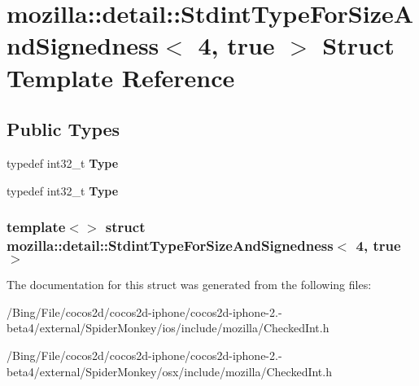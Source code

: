 \hypertarget{structmozilla_1_1detail_1_1_stdint_type_for_size_and_signedness_3_014_00_01true_01_4}{\section{mozilla\-:\-:detail\-:\-:Stdint\-Type\-For\-Size\-And\-Signedness$<$ 4, true $>$ Struct Template Reference}
\label{structmozilla_1_1detail_1_1_stdint_type_for_size_and_signedness_3_014_00_01true_01_4}
}
\subsection*{Public Types}
\begin{DoxyCompactItemize}
\item 
\hypertarget{structmozilla_1_1detail_1_1_stdint_type_for_size_and_signedness_3_014_00_01true_01_4_a237ad7b5316d92211b73f9ccb6250cec}{typedef int32\-\_\-t {\bfseries Type}}\label{structmozilla_1_1detail_1_1_stdint_type_for_size_and_signedness_3_014_00_01true_01_4_a237ad7b5316d92211b73f9ccb6250cec}

\item 
\hypertarget{structmozilla_1_1detail_1_1_stdint_type_for_size_and_signedness_3_014_00_01true_01_4_a237ad7b5316d92211b73f9ccb6250cec}{typedef int32\-\_\-t {\bfseries Type}}\label{structmozilla_1_1detail_1_1_stdint_type_for_size_and_signedness_3_014_00_01true_01_4_a237ad7b5316d92211b73f9ccb6250cec}

\end{DoxyCompactItemize}
\subsubsection*{template$<$$>$ struct mozilla\-::detail\-::\-Stdint\-Type\-For\-Size\-And\-Signedness$<$ 4, true $>$}



The documentation for this struct was generated from the following files\-:\begin{DoxyCompactItemize}
\item 
/\-Bing/\-File/cocos2d/cocos2d-\/iphone/cocos2d-\/iphone-\/2.-\/beta4/external/\-Spider\-Monkey/ios/include/mozilla/Checked\-Int.\-h\item 
/\-Bing/\-File/cocos2d/cocos2d-\/iphone/cocos2d-\/iphone-\/2.-\/beta4/external/\-Spider\-Monkey/osx/include/mozilla/Checked\-Int.\-h\end{DoxyCompactItemize}

